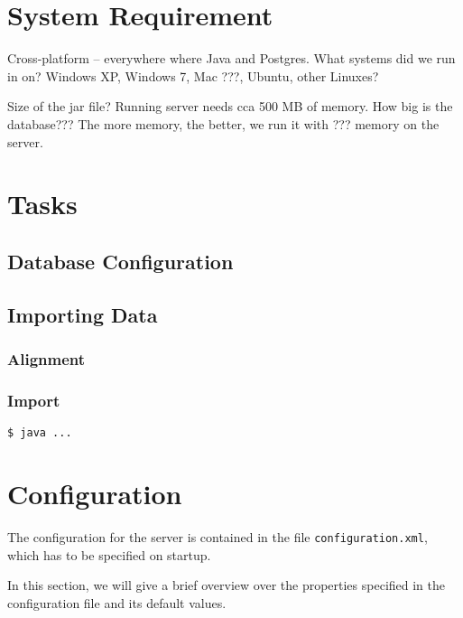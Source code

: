 \label{chap:technical_manual}

\section{System Requirement}

Cross-platform -- everywhere where Java and Postgres. What systems did we run in on? Windows XP, Windows 7, Mac ???, Ubuntu, other Linuxes?

Size of the jar file? Running server needs cca 500 MB of memory. How big is the database??? The more memory, the better, we run it with ??? memory on the server. 

\section{Tasks}
\subsection{Database Configuration}

\subsection{Importing Data}

\subsubsection{Alignment}

\subsubsection{Import}

\begin{lstlisting}
$ java ...
\end{lstlisting}




\section{Configuration}

The configuration for the server is contained in the file \verb#configuration.xml#, which has to be specified on startup.

In this section, we will give a brief overview over the properties specified in the configuration file and its default values.

